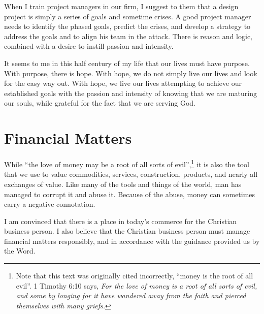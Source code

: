 \documentclass[12pt]{memoir}
\begin{document}
When I train project managers in our firm, I suggest to them that
a design project is simply a series of goals and sometime crises.
A good project manager needs to identify the phased goals, predict
the crises, and develop a strategy to address the goals and to align
his team in the attack. There is reason and logic, combined with a
desire to instill passion and intensity.

It seems to me in this half century of my life that
our lives must have purpose. With purpose, there is hope. With hope,
we do not simply live our lives and look for the easy way out. With
hope, we live our lives attempting to achieve our established goals
with the passion and intensity of knowing that we are maturing our
souls, while grateful for the fact that we are serving God. 

\chapter{Financial Matters}

While ``the love of money may be a root of all sorts of evil'',\footnote{Note that this text was originally cited incorrectly, ``money is the root of all evil''. 1 Timothy 6:10 says, \emph{For the love of money is a root of all sorts of evil, and some by longing for it have wandered away from the faith and pierced themselves with many griefs.}} it is also
the tool that we use to value commodities, services, construction,
products, and nearly all exchanges of value. Like many of the
tools and things of the world, man has managed to corrupt it and abuse
it. Because of the abuse, money can sometimes carry a negative connotation.

I am convinced that there is a place in today's commerce for the Christian
business person. I also believe that the Christian business person
must manage financial matters responsibly, and in accordance with
the guidance provided us by the Word.
\end{document}
